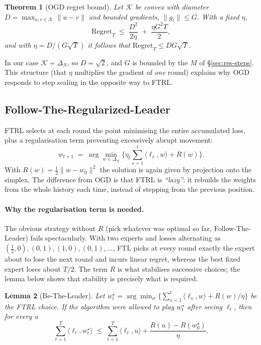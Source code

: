 \documentclass[12pt,a4paper,oneside]{report}
\renewcommand{\_}{\oldunderscore\allowbreak}
\theoremstyle{definition}
\theoremstyle{plain}
\newtheorem{theorem}{Theorem}[chapter]
\newtheorem{lemma}[theorem]{Lemma}
\theoremstyle{remark}
\begin{document}
\begin{theorem}[OGD regret bound]
\label{thm:ogd}
Let $\mathcal{K}$ be convex with diameter $D = \max_{u,v\in\mathcal{K}}\|u-v\|$ and bounded
gradients, $\|g_t\| \leq G$. With a fixed $\eta$,
\[
\mathrm{Regret}_T \;\leq\; \frac{D^2}{2\eta} \;+\; \frac{\eta G^2 T}{2},
\]
and with $\eta = D/(G\sqrt{T})$ it follows that $\mathrm{Regret}_T \leq D G \sqrt{T}$.
\end{theorem}

In our case $\mathcal{K}=\Delta_N$, so $D=\sqrt{2}$, and $G$ is bounded by the $M$ of
\S\ref{sec:res-steps}. This structure (that $\eta$ multiplies the gradient of \emph{one} round)
explains why OGD responds to step scaling in the opposite way to FTRL.

\subsection{Follow-The-Regularized-Leader}

FTRL selects at each round the point minimising the entire accumulated loss, plus a
regularisation term preventing excessively abrupt movement:
\[
w_{t+1} \;=\; \arg\min_{w \in \Delta_N} \Big\{ \eta_t \sum_{s=1}^{t} \langle \ell_s, w \rangle
+ R(w) \Big\}.
\]
With $R(w) = \tfrac12\|w - w_0\|^2$ the solution is again given by projection onto the simplex.
The difference from OGD is that FTRL is \emph{``lazy''}: it rebuilds the weights from the whole
history each time, instead of stepping from the previous position.

\paragraph{Why the regularisation term is needed.} The obvious strategy without $R$ (pick
whatever was optimal so far, Follow-The-Leader) fails spectacularly. With two experts and
losses alternating as $(\tfrac12,0),(0,1),(1,0),(0,1),\dots$, FTL picks at every round exactly
the expert about to lose the next round and incurs linear regret, whereas the best fixed expert
loses about $T/2$. The term $R$ is what stabilises successive choices; the lemma below shows
that stability is precisely what is required.

\begin{lemma}[Be-The-Leader]
\label{lem:btl}
Let $w^{\star}_t = \arg\min_{w} \{\sum_{s=1}^{t}\langle \ell_s,w\rangle + R(w)/\eta\}$ be the
FTRL choice. If the algorithm were allowed to play $w^{\star}_t$ \emph{after} seeing $\ell_t$,
then for every $u$
\[
\sum_{t=1}^{T} \langle \ell_t, w^{\star}_t\rangle \;\leq\; \sum_{t=1}^{T} \langle \ell_t, u\rangle
+ \frac{R(u) - R(w^{\star}_0)}{\eta}.
\]
\end{lemma}
\end{document}
